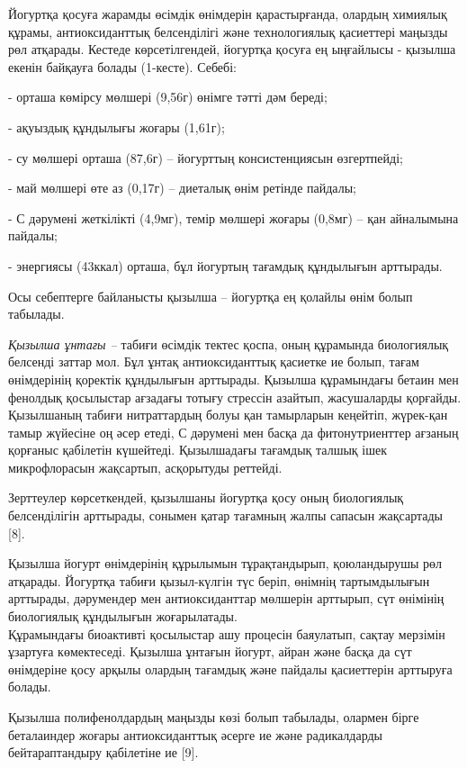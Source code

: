 Йогуртқа қосуға жарамды өсімдік өнімдерін қарастырғанда, олардың
химиялық құрамы, антиоксиданттық белсенділігі және технологиялық
қасиеттері маңызды рөл атқарады. Кестеде көрсетілгендей, йогуртқа қосуға
ең ыңғайлысы - қызылша екенін байқауға болады (1-кесте). Себебі:

- орташа көмірсу мөлшері (9,56г) өнімге тәтті дәм береді;

- ақуыздық құндылығы жоғары (1,61г);

- су мөлшері орташа (87,6г) -- йогурттың консистенциясын өзгертпейді;

- май мөлшері өте аз (0,17г) -- диеталық өнім ретінде пайдалы;

- С дәрумені жеткілікті (4,9мг), темір мөлшері жоғары (0,8мг) -- қан
айналымына пайдалы;

- энергиясы (43ккал) орташа, бұл йогуртың тағамдық құндылығын арттырады.

Осы себептерге байланысты қызылша -- йогуртқа ең қолайлы өнім болып
табылады.

\emph{Қызылша ұнтағы --} табиғи өсімдік тектес қоспа, оның құрамында
биологиялық белсенді заттар мол. Бұл ұнтақ антиоксиданттық қасиетке ие
болып, тағам өнімдерінің қоректік құндылығын арттырады. Қызылша
құрамындағы бетаин мен фенолдық қосылыстар ағзадағы тотығу стрессін
азайтып, жасушаларды қорғайды. Қызылшаның табиғи нитраттардың болуы қан
тамырларын кеңейтіп, жүрек-қан тамыр жүйесіне оң әсер етеді, С дәрумені
мен басқа да фитонутриенттер ағзаның қорғаныс қабілетін күшейтеді.
Қызылшадағы тағамдық талшық ішек микрофлорасын жақсартып, асқорытуды
реттейді.

Зерттеулер көрсеткендей, қызылшаны йогуртқа қосу оның биологиялық
белсенділігін арттырады, сонымен қатар тағамның жалпы сапасын
жақсартады\hspace{0pt} {[}8{]}.

Қызылша йогурт өнімдерінің құрылымын тұрақтандырып, қоюландырушы рөл
атқарады. Йогуртқа табиғи қызыл-күлгін түс беріп, өнімнің тартымдылығын
арттырады, дәрумендер мен антиоксиданттар мөлшерін арттырып, сүт
өнімінің биологиялық құндылығын жоғарылатады.\\
Құрамындағы биоактивті қосылыстар ашу процесін баяулатып, сақтау
мерзімін ұзартуға көмектеседі. Қызылша ұнтағын йогурт, айран және басқа
да сүт өнімдеріне қосу арқылы олардың тағамдық және пайдалы қасиеттерін
арттыруға болады.

Қызылша полифенолдардың маңызды көзі болып табылады, олармен бірге
беталаиндер жоғары антиоксиданттық әсерге ие және радикалдарды
бейтараптандыру қабілетіне ие {[}9{]}.


